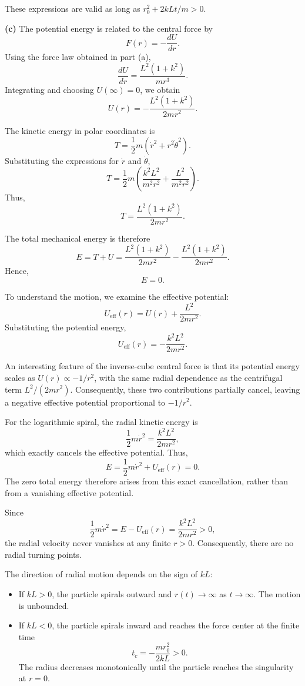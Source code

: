 \documentclass[12pt]{article}
\begin{document}
These expressions are valid as long as
$r_0^2+2kLt/m>0$.

\textbf{(c)} The potential energy is related to the central
force by
\[
F(r)=-\frac{dU}{dr}.
\]
Using the force law obtained in part (a),
\[
\frac{dU}{dr}=\frac{L^2(1+k^2)}{mr^3}.
\]
Integrating and choosing $U(\infty)=0$, we obtain
\[
\boxed{
U(r)=-\frac{L^2(1+k^2)}{2mr^2}.
}
\]

The kinetic energy in polar coordinates is
\[
T=\frac{1}{2}m(\dot{r}^2+r^2\dot{\theta}^2).
\]
Substituting the expressions for $\dot{r}$ and $\dot{\theta}$,
\[
T=\frac{1}{2}m\left(
\frac{k^2L^2}{m^2r^2}
+\frac{L^2}{m^2r^2}
\right).
\]
Thus,
\[
T=\frac{L^2(1+k^2)}{2mr^2}.
\]

The total mechanical energy is therefore
\[
E=T+U
=\frac{L^2(1+k^2)}{2mr^2}
-\frac{L^2(1+k^2)}{2mr^2}.
\]
Hence,
\[
\boxed{E=0.}
\]

To understand the motion, we examine the effective potential:
\[
U_{\mathrm{eff}}(r)
=U(r)+\frac{L^2}{2mr^2}.
\]
Substituting the potential energy,
\[
\boxed{
U_{\mathrm{eff}}(r)
=-\frac{k^2L^2}{2mr^2}.
}
\]

An interesting feature of the inverse-cube central force is that
its potential energy scales as $U(r)\propto -1/r^2$, with the
same radial dependence as the centrifugal term $L^2/(2mr^2)$.
Consequently, these two contributions partially cancel,
leaving a negative effective potential proportional to $-1/r^2$.

For the logarithmic spiral, the radial kinetic energy is
\[
\frac12 m\dot r^2=\frac{k^2L^2}{2mr^2},
\]
which exactly cancels the effective potential. Thus,
\[
E=\frac12 m\dot r^2+U_{\mathrm{eff}}(r)=0.
\]
The zero total energy therefore arises from this exact
cancellation, rather than from a vanishing effective potential.

Since
\[
\frac12 m\dot r^2
=E-U_{\mathrm{eff}}(r)
=\frac{k^2L^2}{2mr^2}>0,
\]
the radial velocity never vanishes at any finite $r>0$.
Consequently, there are no radial turning points.

The direction of radial motion depends on the sign of $kL$:
\begin{itemize}
    \item If $kL>0$, the particle spirals outward and
    $r(t)\to\infty$ as $t\to\infty$. The motion is unbounded.
    \item If $kL<0$, the particle spirals inward and reaches
    the force center at the finite time
    \[
    t_c=-\frac{mr_0^2}{2kL}>0.
    \]
    The radius decreases monotonically until the particle
    reaches the singularity at $r=0$.
\end{itemize}
\end{document}
